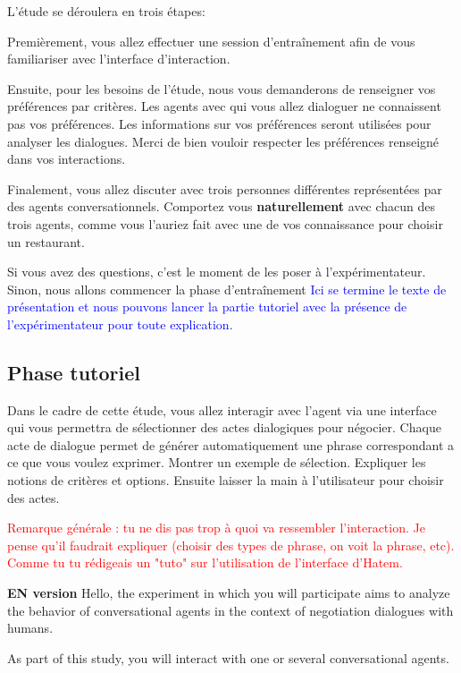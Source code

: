 \documentclass [french]{paper}
\begin{document}
		L'étude se déroulera en trois étapes:
		
		Premièrement, vous allez effectuer une session d'entraînement afin de vous familiariser avec l'interface d'interaction.
		
		Ensuite, pour les besoins de l'étude, nous vous demanderons de renseigner vos préférences par critères. Les agents avec qui vous allez dialoguer ne connaissent pas vos préférences. Les informations sur vos préférences seront utilisées pour analyser les dialogues. Merci de bien vouloir respecter les préférences renseigné dans vos interactions.
		
		Finalement, vous allez discuter avec trois personnes différentes représentées par des agents conversationnels.  Comportez vous \textbf{naturellement} avec chacun des trois agents, comme vous l'auriez fait avec une de vos connaissance pour choisir un restaurant.  
		
		
		 Si vous avez des questions, c'est le moment de les poser à l'expérimentateur. Sinon, nous allons commencer la phase d'entraînement 
		\textcolor{blue}{Ici se termine le texte de présentation et nous pouvons lancer la partie tutoriel avec la présence de l'expérimentateur pour toute explication}.
		
			\subsection{Phase tutoriel}
			Dans le cadre de cette étude, vous allez interagir avec l'agent via une interface qui vous permettra de sélectionner des actes dialogiques pour négocier. 
			Chaque acte de dialogue permet de générer automatiquement une phrase correspondant a ce que vous voulez exprimer.
			Montrer un exemple de sélection. Expliquer les notions de critères et options. Ensuite laisser la main à l'utilisateur pour choisir des actes.  
			

		
		\textcolor{red}{Remarque générale : tu ne dis pas trop à quoi va ressembler l'interaction. Je pense qu'il faudrait expliquer (choisir des types de phrase, on voit la phrase, etc). Comme tu tu rédigeais un "tuto" sur l'utilisation de l'interface d'Hatem. }
		
		\textbf{EN version}
			Hello, the experiment in which you will participate aims to analyze the behavior of conversational agents in the context of negotiation dialogues with  humans.
			
			As part of this study, you will interact with one or several conversational agents.
			
\end{document}
